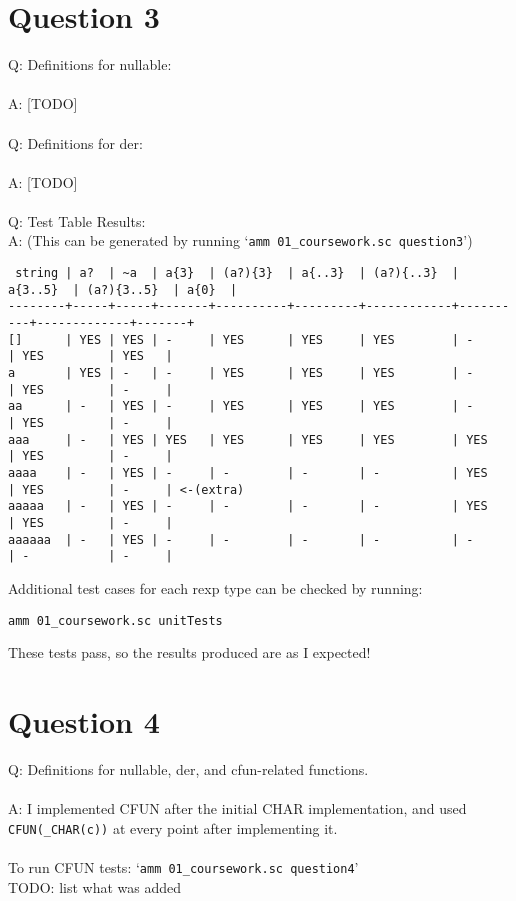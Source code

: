 \documentclass[english]{scrartcl}
\begin{document}
\section*{Question 3}
Q: Definitions for nullable:
\\
\\
A: [TODO]
\\
\\
Q: Definitions for der:
\\
\\
A: [TODO]
\\
\\
Q: Test Table Results: \\
A: (This can be generated by running `\verb|amm 01_coursework.sc question3|')
\footnotesize\begin{verbatim}
 string | a?  | ~a  | a{3}  | (a?){3}  | a{..3}  | (a?){..3}  | a{3..5}  | (a?){3..5}  | a{0}  |
--------+-----+-----+-------+----------+---------+------------+----------+-------------+-------+
[]      | YES | YES | -     | YES      | YES     | YES        | -        | YES         | YES   |
a       | YES | -   | -     | YES      | YES     | YES        | -        | YES         | -     |
aa      | -   | YES | -     | YES      | YES     | YES        | -        | YES         | -     |
aaa     | -   | YES | YES   | YES      | YES     | YES        | YES      | YES         | -     |
aaaa    | -   | YES | -     | -        | -       | -          | YES      | YES         | -     | <-(extra)
aaaaa   | -   | YES | -     | -        | -       | -          | YES      | YES         | -     |
aaaaaa  | -   | YES | -     | -        | -       | -          | -        | -           | -     |
\end{verbatim}
\normalsize

Additional test cases for each rexp type can be checked by running:
\begin{center}
    \verb|amm 01_coursework.sc unitTests|
\end{center}

These tests pass, so the results produced are as I expected!

\section*{Question 4}
Q: Definitions for nullable, der, and cfun-related functions.
\\
\\
A: I implemented CFUN after the initial CHAR implementation, and used \verb|CFUN(_CHAR(c))| at every point after implementing it.\\
\\
To run CFUN tests: `\verb|amm 01_coursework.sc question4|' \\
TODO: list what was added
\end{document}
